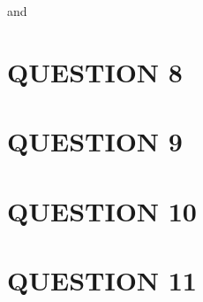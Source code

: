 \documentclass[a4paper]{article}
\begin{document}
and 


\section{QUESTION 8}



\section{QUESTION 9}


\section{QUESTION 10}
\section{QUESTION 11}
\end{document}
